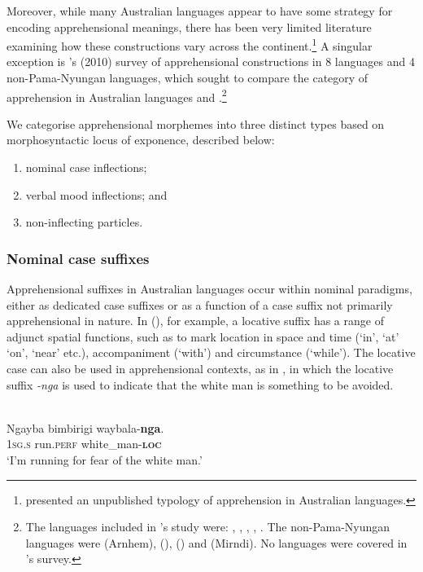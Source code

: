 \documentclass[output=paper,colorlinks,citecolor=brown]{langscibook}
\begin{document}
Moreover, while many Australian languages appear to have some strategy for encoding apprehensional meanings, there has been very limited literature examining how these constructions vary across the continent.\footnote{\citet{gaby_expression_2017} presented an unpublished typology of apprehension in Australian languages.} A singular exception is \citeauthor{zester_semantics_2010}'s (2010) survey of apprehensional constructions in 8  languages and 4 non-Pama-Nyungan languages, which sought to compare the category of apprehension in Australian languages and .\footnote{The  languages included in \citeauthor{zester_semantics_2010}'s study were: , , , , . The non-Pama-Nyungan languages were  (Arnhem),  (),  () and  (Mirndi). No  languages were covered in \citeauthor{zester_semantics_2010}'s survey.} 

We categorise apprehensional morphemes into three distinct types based on morphosyntactic locus of exponence, described below:
\begin{enumerate}
\itemsep-0.2cm
    \item nominal case inflections;
    \item verbal mood inflections; and
    \item non-inflecting particles.
\end{enumerate}

\subsubsection{Nominal case suffixes}

\noindent Apprehensional suffixes in Australian languages occur within nominal paradigms, either as dedicated case suffixes or as a function of a case suffix not primarily apprehensional in nature. In  (), for example, a locative suffix has a range of adjunct spatial functions, such as to mark location in space and time (`in', `at' `on', `near' etc.), accompaniment (`with') and circumstance (`while'). The  locative case can also be used in apprehensional contexts, as in , in which the locative suffix \textit{-nga} is used to indicate that the white man is something to be avoided.

\ea
{} {\citealt[30]{dixon_wargamay_1981}} \\
\gll Ngayba bimbirigi waybala-\textbf{nga}. \\
\textsc{1sg.s} run.\textsc{perf} {white\_man-\textsc{\textbf{loc}}} \\
\glt `I'm running for fear of the white man.' 
\label{ex:bro3}
\z
\end{document}
